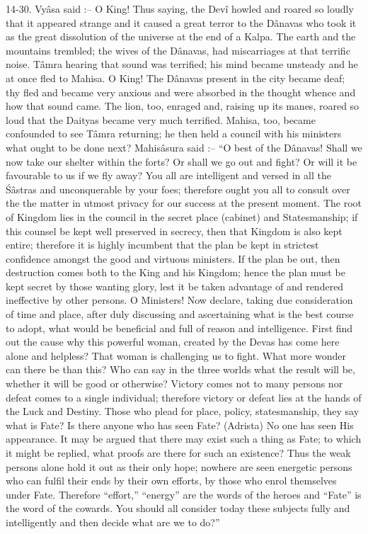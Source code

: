 14-30. Vy\^asa said :-- O King! Thus saying, the Dev\^i howled and roared so loudly that it appeared strange and it caused a great terror to the D\^anavas who took it as the great dissolution of the universe at the end of a Kalpa. The earth and the mountains trembled; the wives of the D\^anavas, had miscarriages at that terrific noise. T\^amra hearing that sound was terrified; his mind became unsteady and he at once fled to Mahisa. O King! The D\^anavas present in the city became deaf; thy fled and became very anxious and were absorbed in the thought whence and how that sound came. The lion, too, enraged and, raising up its manes, roared so loud that the Daityas became very much terrified. Mahisa, too, became confounded to see T\^amra returning; he then held a council with his ministers what ought to be done next? Mahis\^asura said :-- ``O best of the D\^anavas! Shall we now take our shelter within the forts? Or shall we go out and fight? Or will it be favourable to us if we fly away? You all are intelligent and versed in all the \'S\^astras and unconquerable by your foes; therefore ought you all to consult over the the matter in utmost privacy for our success at the present moment. The root of Kingdom lies in the council in the secret place (cabinet) and Statesmanship; if this counsel be kept well preserved in secrecy, then that Kingdom is also kept entire; therefore it is highly incumbent that the plan be kept in strictest confidence amongst the good and virtuous ministers. If the plan be out, then destruction comes both to the King and his Kingdom; hence the plan must be kept secret by those wanting glory, lest it be taken advantage of and rendered ineffective by other persons. O Ministers! Now declare, taking due consideration of time and place, after duly discussing and ascertaining what is the best course to adopt, what would be beneficial and full of reason and intelligence. First find out the cause why this powerful woman, created by the Devas has come here alone and helpless? That woman is challenging us to fight. What more wonder can there be than this? Who can say in the three worlds what the result will be, whether it will be good or otherwise? Victory comes not to many persons nor defeat comes to a single individual; therefore victory or defeat lies at the hands of the Luck and Destiny. Those who plead for place, policy, statesmanship, they say what is Fate? Is there anyone who has seen Fate? (Adrista) No one has seen His appearance. It may be argued that there may exist such a thing as Fate; to which it might be replied, what proofs are there for such an existence? Thus the weak persons alone hold it out as their only hope; nowhere are seen energetic persons who can fulfil their ends by their own efforts, by those who enrol themselves under Fate. Therefore ``effort,'' ``energy'' are the words of the heroes and ``Fate'' is the word of the cowards. You should all consider today these subjects fully and intelligently and then decide what are we to do?''

